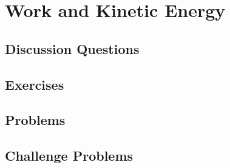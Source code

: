 
\chapter{Work and Kinetic Energy}

\section{Discussion Questions}

\section{Exercises}

\section{Problems}

\section{Challenge Problems}
